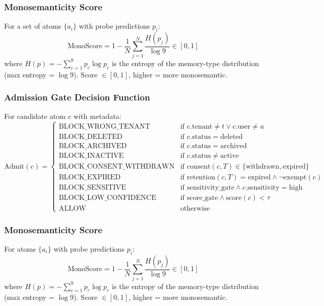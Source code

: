 \documentclass[11pt]{article}
\begin{document}
\subsubsection{Monosemanticity Score}
For a set of atoms $\{a_i\}$ with probe predictions $p_i$:
\begin{equation}
\text{MonoScore} = 1 - \frac{1}{N}\sum_{j=1}^N \frac{H(p_j)}{\log 9} \in [0, 1]
\end{equation}
where $H(p) = -\sum_{c=1}^9 p_c \log p_c$ is the entropy of the memory-type distribution (max entropy = $\log 9$). Score $\in [0,1]$, higher = more monosemantic.

\subsubsection{Admission Gate Decision Function}
For candidate atom $c$ with metadata:
\begin{equation}
\text{Admit}(c) = 
\begin{cases}
\text{BLOCK\_WRONG\_TENANT} & \text{if } c.\text{tenant} \neq t \lor c.\text{user} \neq u \\
\text{BLOCK\_DELETED} & \text{if } c.\text{status} = \text{deleted} \\
\text{BLOCK\_ARCHIVED} & \text{if } c.\text{status} = \text{archived} \\
\text{BLOCK\_INACTIVE} & \text{if } c.\text{status} \neq \text{active} \\
\text{BLOCK\_CONSENT\_WITHDRAWN} & \text{if } \text{consent}(c, T) \in \{\text{withdrawn}, \text{expired}\} \\
\text{BLOCK\_EXPIRED} & \text{if } \text{retention}(c, T) = \text{expired} \land \neg\text{exempt}(c) \\
\text{BLOCK\_SENSITIVE} & \text{if } \text{sensitivity\_gate} \land c.\text{sensitivity} = \text{high} \\
\text{BLOCK\_LOW\_CONFIDENCE} & \text{if } \text{score\_gate} \land \text{score}(c) < \tau \\
\text{ALLOW} & \text{otherwise}
\end{cases}
\end{equation}

\subsubsection{Monosemanticity Score}
For atoms $\{a_i\}$ with probe predictions $p_i$:
\begin{equation}
\text{MonoScore} = 1 - \frac{1}{N}\sum_{j=1}^N \frac{H(p_j)}{\log 9} \in [0, 1]
\end{equation}
where $H(p) = -\sum_{c=1}^9 p_c \log p_c$ is the entropy of the memory-type distribution (max entropy = $\log 9$). Score $\in [0,1]$, higher = more monosemantic.
\end{document}
